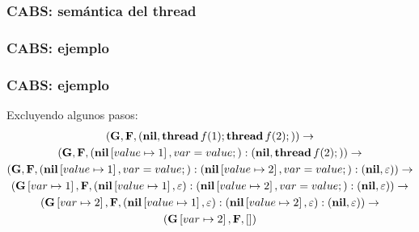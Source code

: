 \documentclass[spanish, a4paper, 12pt, final, slideColor, nototal, colorBG, pdf, noaccumulate, darkblue] {beamer}
\begin{document}
\begin{frame}[fragile]
  \frametitle{CABS: semántica del thread}
  \fontsize{8}{7.2}\selectfont
\begin{prooftree*}
\end{prooftree*}

\begin{prooftree*}
\end{prooftree*}

  \fontsize{6}{7.2}\selectfont
\begin{prooftree*}
\end{prooftree*}
\end{frame}

\begin{frame}[fragile]
  \frametitle{CABS: ejemplo}
  
\end{frame}

\begin{frame}[fragile]
  \frametitle{CABS: ejemplo}
  \fontsize{8}{7.2}\selectfont
  Excluyendo algunos pasos:
\begin{multline*}
  (\mathbf{G}, \mathbf{F}, (\textbf{nil}, \textbf{thread} \,f(1)\mbox{;\,}\textbf{thread} \,f(2)\mbox{;\,})) \rightarrow \\
  (\mathbf{G}, \mathbf{F}, (\textbf{nil}\left[ value\mapsto1 \right], var = value\mbox{;\,}):(\textbf{nil}, \textbf{thread} \,f(2)\mbox{;\,})) \rightarrow \\
  (\mathbf{G}, \mathbf{F}, (\textbf{nil}\left[ value\mapsto1 \right], var = value\mbox{;\,}):(\textbf{nil}\left[ value\mapsto2 \right], var = value\mbox{;\,}):(\textbf{nil}, \varepsilon)) \rightarrow \\
  (\mathbf{G}\left[ var\mapsto1 \right], \mathbf{F}, (\textbf{nil}\left[ value\mapsto1 \right], \varepsilon):(\textbf{nil}\left[ value\mapsto2 \right], var = value\mbox{;\,}):(\textbf{nil}, \varepsilon)) \rightarrow \\
  (\mathbf{G}\left[ var\mapsto2 \right], \mathbf{F}, (\textbf{nil}\left[ value\mapsto1 \right], \varepsilon):(\textbf{nil}\left[ value\mapsto2 \right], \varepsilon):(\textbf{nil}, \varepsilon)) \rightarrow \\
  (\mathbf{G}\left[ var\mapsto2 \right], \mathbf{F}, [])
\end{multline*}
\end{frame}
\end{document}
